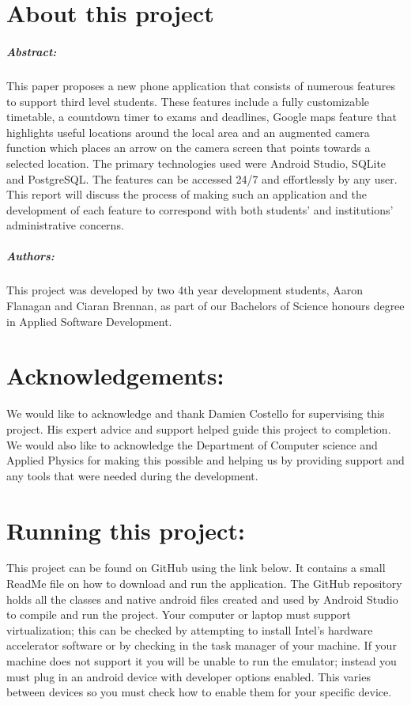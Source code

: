 
\chapter*{About this project}
\paragraph{Abstract:}
This paper proposes a new phone application that consists of numerous features to support third level students. These features include a fully customizable timetable, a countdown timer to exams and deadlines, Google maps feature that highlights useful locations around the local area and an augmented camera function which places an arrow on the camera screen that points towards a selected location. The primary technologies used were Android Studio, SQLite and PostgreSQL. The features can be accessed 24/7 and effortlessly by any user. This report will discuss the process of making such an application and the development of each feature to correspond with both students’ and institutions’ administrative concerns.
 
\paragraph{Authors:}
This project was developed by two 4th year development students, Aaron Flanagan and Ciaran Brennan, as part of our Bachelors of Science honours degree in Applied Software Development.

\chapter*{Acknowledgements:}
We would like to acknowledge and thank Damien Costello for supervising this project. His expert advice and support helped guide this project to completion. We would also like to acknowledge the Department of Computer science and Applied Physics for making this possible and helping us by providing support and any tools that were needed during the development.

\chapter*{Running this project:}
This project can be found on GitHub using the link below.
It contains a small ReadMe file on how to download and run the application. The GitHub repository holds all the classes and native android files created and used by Android Studio to compile and run the project. Your computer or laptop must support virtualization; this can be checked by attempting to install Intel's hardware accelerator software or by checking in the task manager of your machine. If your machine does not support it you will be unable to run the emulator; instead you must plug in an android device with developer options enabled. This varies between devices so you must check how to enable them for your specific device.
